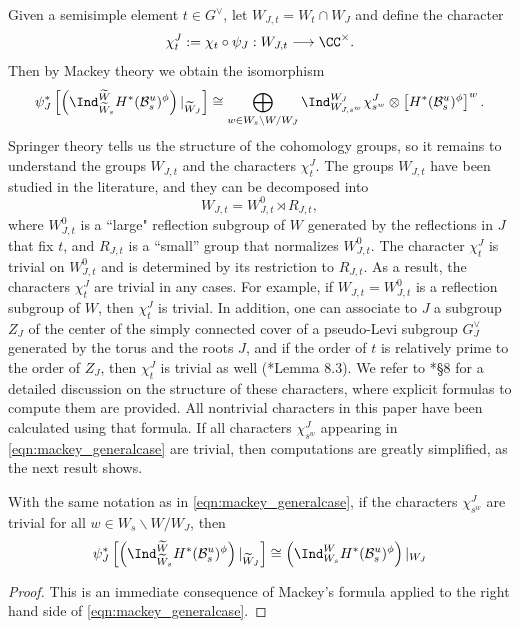 Given a semisimple element $t\in G^\vee$, let $W_{J,t}=W_t\cap W_J$ and define the character
\begin{equation}
    \chi_t^J:=\chi_t\circ\psi_J:W_{J,t}\longrightarrow\CC^\times.
\end{equation}
Then by Mackey theory we obtain the isomorphism
\begin{equation}%
    \psi_J^*\left[\left(\Ind_{\widetilde{W}_s}^{\widetilde{W}}H^*(\mathcal{B}^u_s)^\phi\right)|_{\widetilde{W}_J}\right]\cong\bigoplus_{w\in W_s\backslash W/W_J}\Ind_{W_{J,s^w}}^{W_J}\chi_{s^w}^J\otimes\left[H^*(\mathcal{B}^u_s)^\phi\right]^w.
\end{equation}
Springer theory tells us the structure of the cohomology groups, so it remains to understand the groups $W_{J,t}$ and the characters $\chi_t^J$. The groups $W_{J,t}$ have been studied in the literature, and they can be decomposed into 
$$W_{J,t}=W_{J,t}^0\rtimes R_{J,t},$$
where $W_{J,t}^0$ is a ``large" reflection subgroup of $W$ generated by the reflections in $J$ that fix $t$, and $R_{J,t}$ is a ``small'' group that normalizes $W_{J,t}^0$. The character $\chi_t^J$ is trivial on $W_{J,t}^0$ and is determined by its restriction to $R_{J,t}$. As a result, the characters $\chi_t^J$ are trivial in any cases. For example, if $W_{J,t}=W_{J,t}^0$ is a reflection subgroup of $W$, then $\chi_t^J$ is trivial. In addition, one can associate to $J$ a subgroup $Z_J$ of the center of the simply connected cover of a pseudo-Levi subgroup $G^\vee_J$ generated by the torus and the roots $J$, and if the order of $t$ is relatively prime to the order of $Z_J$, then $\chi_t^J$ is trivial as well (\cite{Reeder2000}*{Lemma 8.3}). We refer to \cite{Reeder2000}*{\S 8} for a detailed discussion on the structure of these characters, where explicit formulas to compute them are provided. All nontrivial characters in this paper have been calculated using that formula. If all characters $\chi_{s^w}^{J}$ appearing in \eqref{eqn:mackey_generalcase} are trivial, then computations are greatly simplified, as the next result shows.
\begin{lemma}\label{lem:mackey_restriction}
    With the same notation as in \eqref{eqn:mackey_generalcase}, if the characters $\chi_{s^w}^{J}$ are trivial for all $w\in W_s\backslash W/W_J$, then
    $$\psi_J^*\left[\left(\Ind_{\widetilde{W}_s}^{\widetilde{W}}H^*(\mathcal{B}^u_s)^\phi\right)|_{\widetilde{W}_J}\right]\cong\left(\Ind_{W_s}^W H^*(\mathcal{B}^u_s)^\phi\right)|_{W_J}$$
\end{lemma}
\begin{proof}
    This is an immediate consequence of Mackey's formula applied to the right hand side of \eqref{eqn:mackey_generalcase}.
\end{proof}